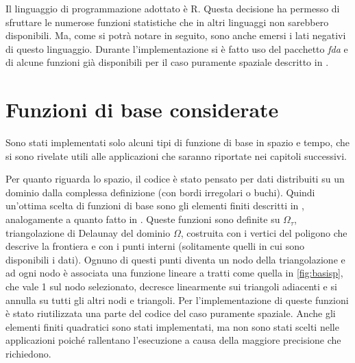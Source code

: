 \documentclass[a4paper,11pt,twoside,openright]{book}							%
\begin{document}
Il linguaggio di programmazione adottato è R. Questa decisione ha permesso di sfruttare le numerose funzioni statistiche che in altri linguaggi non sarebbero disponibili. Ma, come si potrà notare in seguito, sono anche emersi i lati negativi di questo linguaggio. Durante l'implementazione si è fatto uso del pacchetto \textit{fda} e di alcune funzioni già disponibili per il caso puramente spaziale descritto in \cite{art:sangalli}.

\section{Funzioni di base considerate}
Sono stati implementati solo alcuni tipi di funzione di base in spazio e tempo, che si sono rivelate utili alle applicazioni che saranno riportate nei capitoli successivi. 

Per quanto riguarda lo spazio, il codice è stato pensato per dati distribuiti su un dominio dalla complessa definizione (con bordi irregolari o buchi). Quindi un'ottima scelta di funzioni di base sono gli elementi finiti descritti in \cite{art:quarteroni}, analogamente a quanto fatto in \cite{art:sangalli}. Queste funzioni sono definite su $\Omega_{\tau}$, triangolazione di Delaunay del dominio $\Omega$, costruita con i vertici del poligono che descrive la frontiera e con i punti interni (solitamente quelli in cui sono disponibili i dati). Ognuno di questi punti diventa un nodo della triangolazione e ad ogni nodo è associata una funzione lineare a tratti come quella in \ref{fig:basisp}, che vale 1 sul nodo selezionato, decresce linearmente sui triangoli adiacenti e si annulla su tutti gli altri nodi e triangoli. Per l'implementazione di queste funzioni è stato riutilizzata una parte del codice del caso puramente spaziale. Anche gli elementi finiti quadratici sono stati implementati, ma non sono stati scelti nelle applicazioni poiché rallentano l'esecuzione a causa della maggiore precisione che richiedono.
\end{document}
